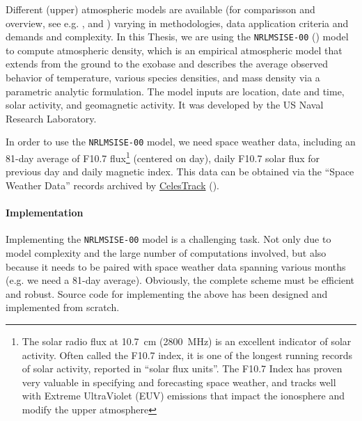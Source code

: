 Different (upper) atmospheric models are available (for comparisson and overview, see e.g. 
\cite{Doornbos2009}, \cite{Yang2022} and \cite{Vallado2014}) varying in methodologies, 
data application criteria and demands and complexity. In this Thesis, we are using 
the \texttt{NRLMSISE-00} (\cite{nrlmsise00}) model to compute atmospheric density, which is
an empirical atmospheric model that extends from the ground to the exobase and describes 
the average observed behavior of temperature, various species densities, and mass density 
via a parametric analytic formulation. The model inputs are location, date and time, 
solar activity, and geomagnetic activity. It was developed by the US Naval Research Laboratory.

In order to use the \texttt{NRLMSISE-00} model, we need space weather data, including 
an 81-day average of F10.7 flux\footnote{The solar radio flux at \SI{10.7}{\cm} (\SI{2800}{\MHz}) 
is an excellent indicator of solar activity. Often called the F10.7 index, it is 
one of the longest running records of solar activity, reported in ``solar flux units''. 
The F10.7 Index has proven very valuable in specifying and forecasting space weather, 
and tracks well with Extreme UltraViolet (EUV) emissions that impact the ionosphere 
and modify the upper atmosphere} (centered on day), daily F10.7 solar flux for previous 
day and daily magnetic index. This data can be obtained via the ``Space Weather Data'' 
records archived by \href{https://celestrak.org/}{CelesTrack} (\cite{Vallado2013}).

\paragraph{Implementation}\label{par:atmospheric-drag-implementation}

Implementing the \texttt{NRLMSISE-00} model is a challenging task. Not only due to
model complexity and the large number of computations involved, but also because 
it needs to be paired with space weather data spanning various months (e.g. we need a 
81-day average). Obviously, the complete scheme must be efficient and robust.
Source code for implementing the above has been designed and implemented from scratch.

